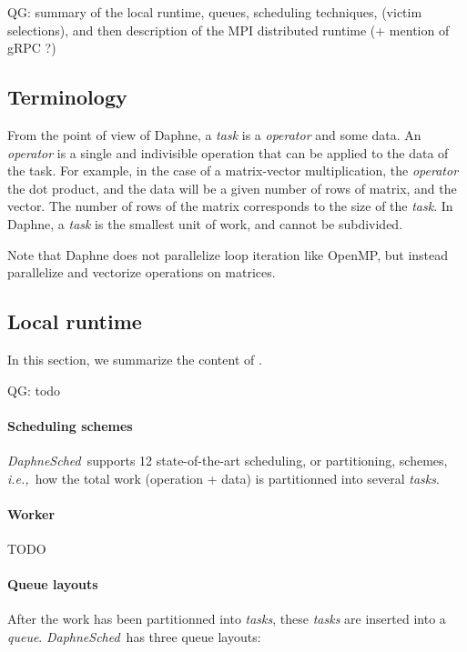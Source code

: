 \documentclass[conference,10pt,a4paper]{IEEEtran}
\newcommand{\ie}{\emph{i.e.,}}
\newcommand{\ds}{\emph{DaphneSched}}
\newcommand{\qg}[1]{{\color{blue} QG: #1}} %
\begin{document}
\qg{summary of the local runtime, queues, scheduling techniques, (victim selections), and then description of the MPI distributed runtime (+ mention of gRPC ?)}

\subsection{Terminology}

From the point of view of Daphne, a \emph{task} is a \emph{operator} and some data.
An \emph{operator} is a single and indivisible operation that can be applied to the data of the task.
For example, in the case of a matrix-vector multiplication, the \emph{operator} the dot product, and the data will be a given number of rows of matrix, and the vector.
The number of rows of the matrix corresponds to the size of the \emph{task}.
In Daphne, a \emph{task} is the smallest unit of work, and cannot be subdivided.

Note that Daphne does not parallelize loop iteration like OpenMP, but instead parallelize and vectorize operations on matrices.

\subsection{Local runtime}\label{sec:daphnesched:local}

In this section, we summarize the content of \cite{eleliemy2023daphnesched}.

\qg{todo}

\paragraph{Scheduling schemes}

\ds\ supports 12 state-of-the-art scheduling, or partitioning, schemes, \ie\ how the total work (operation + data) is partitionned into several \emph{tasks}.

\paragraph{Worker}

TODO

\paragraph{Queue layouts}

After the work has been partitionned into \emph{tasks}, these \emph{tasks} are inserted into a \emph{queue}.
\ds\ has three queue layouts:
\end{document}
